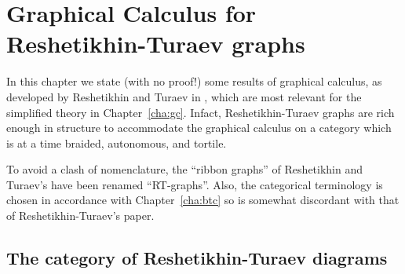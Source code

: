 

\chapter{Graphical Calculus for Reshetikhin-Turaev graphs}
\label{cha:rt}

In this chapter we state (with no proof!) some results of graphical
calculus, as developed by Reshetikhin and Turaev in
\cite{reshetikhin-turaev;ribbon-graphs}, which are most relevant for
the simplified theory in Chapter~\ref{cha:gc}. Infact, Reshetikhin-Turaev
graphs are rich enough in structure to accommodate the graphical
calculus on a category which is at a time braided, autonomous, and
tortile.

To avoid a clash of nomenclature, the ``ribbon graphs'' of Reshetikhin
and Turaev's \cite{reshetikhin-turaev;ribbon-graphs} have been renamed
``RT-graphs''. Also, the categorical terminology is chosen in
accordance with Chapter~\ref{cha:btc} so is somewhat discordant with that of
Reshetikhin-Turaev's paper.

\section{The category of Reshetikhin-Turaev diagrams} 
\label{sec:rt-diagrams}

